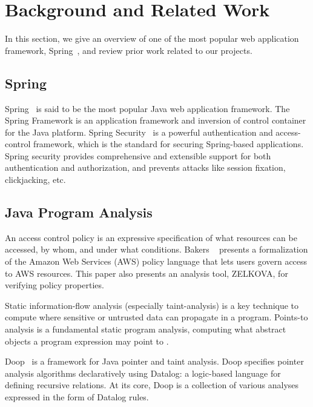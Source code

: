 \section{Background and Related Work} %
In this section, we give an overview of one of the most popular web application
framework, Spring~\cite{spring+security:home}, and review prior work related to
our projects.

\subsection{Spring}

Spring~\cite{spring+security:home} is said to be the most popular Java web
application framework.
%
The Spring Framework is an application framework and inversion of control
container for the Java platform.
%
Spring Security~\cite{spring+security:method} is a powerful authentication and
access-control framework, which is the standard for securing Spring-based
applications.
%
Spring security provides comprehensive and extensible support for both
authentication and authorization, and prevents attacks like session fixation,
clickjacking, etc.

\subsection{Java Program Analysis}

An access control policy is an expressive specification of what resources can be accessed, by whom, and under what conditions. Bakers \etal~\cite{Backes+etal:2018:Zelkova} presents a formalization of the Amazon Web Services (AWS) policy language  that lets users govern access to AWS resources. This paper also presents an analysis tool, ZELKOVA, for verifying policy properties.

Static information-flow analysis (especially taint-analysis) is a key technique to compute where sensitive or untrusted data can propagate in a program. Points-to analysis is a fundamental static program analysis, computing what abstract objects a program expression may point to \cite{10.1145/3133926}.

Doop~\cite{Bravenboer:2009:Doop} is a framework for Java pointer and taint
analysis.
%
Doop specifies pointer analysis algorithms declaratively using Datalog: a
logic-based language for defining recursive relations.
%
At its core, Doop is a collection of various analyses expressed in the form of
Datalog rules.

